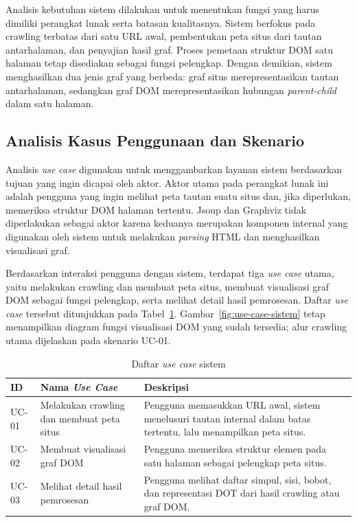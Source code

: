 Analisis kebutuhan sistem dilakukan untuk menentukan fungsi yang harus dimiliki perangkat lunak serta batasan kualitasnya. Sistem berfokus pada crawling terbatas dari satu URL awal, pembentukan peta situs dari tautan antarhalaman, dan penyajian hasil graf. Proses pemetaan struktur DOM satu halaman tetap disediakan sebagai fungsi pelengkap. Dengan demikian, sistem menghasilkan dua jenis graf yang berbeda: graf situs merepresentasikan tautan antarhalaman, sedangkan graf DOM merepresentasikan hubungan \textit{parent-child} dalam satu halaman.

\subsection{Analisis Kasus Penggunaan dan Skenario}
Analisis \textit{use case} digunakan untuk menggambarkan layanan sistem berdasarkan tujuan yang ingin dicapai oleh aktor. Aktor utama pada perangkat lunak ini adalah pengguna yang ingin melihat peta tautan suatu situs dan, jika diperlukan, memeriksa struktur DOM halaman tertentu. Jsoup dan Graphviz tidak diperlakukan sebagai aktor karena keduanya merupakan komponen internal yang digunakan oleh sistem untuk melakukan \textit{parsing} HTML dan menghasilkan visualisasi graf.

Berdasarkan interaksi pengguna dengan sistem, terdapat tiga \textit{use case} utama, yaitu melakukan crawling dan membuat peta situs, membuat visualisasi graf DOM sebagai fungsi pelengkap, serta melihat detail hasil pemrosesan. Daftar \textit{use case} tersebut ditunjukkan pada Tabel~\ref{tab:use-case-sistem}. Gambar~\ref{fig:use-case-sistem} tetap menampilkan diagram fungsi visualisasi DOM yang sudah tersedia; alur crawling utama dijelaskan pada skenario UC-01.

\begin{table}[H]
    \centering
    \caption{Daftar \textit{use case} sistem}
    \label{tab:use-case-sistem}
\begin{tabular}{|p{}|p{}|p{}|}
    \hline
    \textbf{ID} & \textbf{Nama \textit{Use Case}} & \textbf{Deskripsi} \\ \hline
    UC-01 & Melakukan crawling dan membuat peta situs & Pengguna memasukkan URL awal, sistem menelusuri tautan internal dalam batas tertentu, lalu menampilkan peta situs. \\ \hline
    UC-02 & Membuat visualisasi graf DOM & Pengguna memeriksa struktur elemen pada satu halaman sebagai pelengkap peta situs. \\ \hline
    UC-03 & Melihat detail hasil pemrosesan & Pengguna melihat daftar simpul, sisi, bobot, dan representasi DOT dari hasil crawling atau graf DOM. \\ \hline
\end{tabular}
\end{table}


